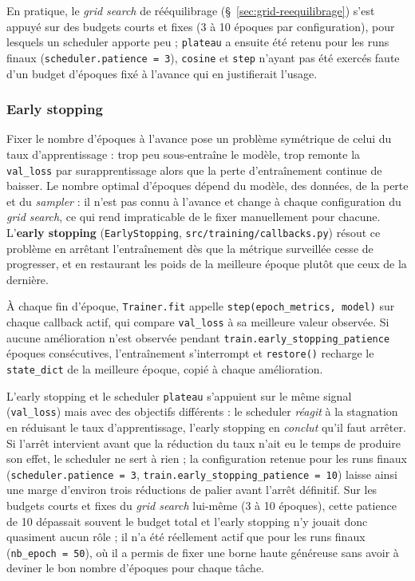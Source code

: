 En pratique, le \emph{grid search} de rééquilibrage (\S~\ref{sec:grid-reequilibrage}) s’est appuyé sur des budgets courts et fixes (3 à 10 époques par configuration), pour lesquels un scheduler apporte peu ; \texttt{plateau} a ensuite été retenu pour les runs finaux (\texttt{scheduler.patience = 3}), \texttt{cosine} et \texttt{step} n’ayant pas été exercés faute d’un budget d’époques fixé à l’avance qui en justifierait l’usage.

\subsubsection{Early stopping}

Fixer le nombre d’époques à l’avance pose un problème symétrique de celui du taux d’apprentissage : trop peu sous-entraîne le modèle, trop remonte la \texttt{val\_loss} par surapprentissage alors que la perte d’entraînement continue de baisser.
Le nombre optimal d’époques dépend du modèle, des données, de la perte et du \emph{sampler} : il n’est pas connu à l’avance et change à chaque configuration du \emph{grid search}, ce qui rend impraticable de le fixer manuellement pour chacune.
L’\textbf{early stopping} \parencite{prechelt1998earlystopping,goodfellow2016deeplearning} (\texttt{EarlyStopping}, \texttt{src/training/callbacks.py}) résout ce problème en arrêtant l’entraînement dès que la métrique surveillée cesse de progresser, et en restaurant les poids de la meilleure époque plutôt que ceux de la dernière.

À chaque fin d’époque, \texttt{Trainer.fit} appelle \texttt{step(epoch\_metrics, model)} sur chaque callback actif, qui compare \texttt{val\_loss} à sa meilleure valeur observée.
Si aucune amélioration n’est observée pendant \texttt{train.early\_\allowbreak stopping\_\allowbreak patience} époques consécutives, l’entraînement s’interrompt et \texttt{restore()} recharge le \texttt{state\_dict} de la meilleure époque, copié à chaque amélioration.

L’early stopping et le scheduler \texttt{plateau} s’appuient sur le même signal (\texttt{val\_loss}) mais avec des objectifs différents : le scheduler \emph{réagit} à la stagnation en réduisant le taux d’apprentissage, l’early stopping en \emph{conclut} qu’il faut arrêter.
Si l’arrêt intervient avant que la réduction du taux n’ait eu le temps de produire son effet, le scheduler ne sert à rien ; la configuration retenue pour les runs finaux (\texttt{scheduler.patience = 3}, \texttt{train.early\_stopping\_patience = 10}) laisse ainsi une marge d’environ trois réductions de palier avant l’arrêt définitif.
Sur les budgets courts et fixes du \emph{grid search} lui-même (3 à 10 époques), cette patience de 10 dépassait souvent le budget total et l’early stopping n’y jouait donc quasiment aucun rôle ; il n’a été réellement actif que pour les runs finaux (\texttt{nb\_epoch = 50}), où il a permis de fixer une borne haute généreuse sans avoir à deviner le bon nombre d’époques pour chaque tâche.

